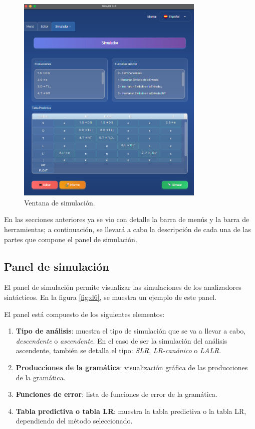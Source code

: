 \begin{figure}[htp]
\centering
	\includegraphics[width=0.8\textwidth]{figuras2/ejemplo_practico/simulador.png}
	\caption{Ventana de simulación.}
	\label{fig:d5}
\end{figure}

  En las secciones anteriores ya se vio con detalle la barra de menús y la barra de herramientas; a continuación, se llevará a cabo la descripción de cada una de las partes que compone el panel de simulación.



\subsection{Panel de simulación}

El panel de simulación permite visualizar las simulaciones de los analizadores sintácticos. En la figura \ref{fig:d6}, se muestra un ejemplo de este panel.

El panel está compuesto de los siguientes elementos:
\begin{enumerate}
 \item \textbf{Tipo de análisis}: muestra el tipo de simulación que se va a llevar a cabo, \textit{descendente} o \textit{ascendente}. En el caso de ser la simulación del análisis ascendente, también se detalla el tipo: \textit{SLR}, \textit{LR-canónico} o \textit{LALR}.
 \item \textbf{Producciones de la gramática}: visualización gráfica de las producciones de la gramática.
 \item \textbf{Funciones de error}: lista de funciones de error de la gramática.
 \item \textbf{Tabla predictiva o tabla LR}: muestra la tabla predictiva o la tabla LR, dependiendo del método seleccionado.
\end{enumerate}

